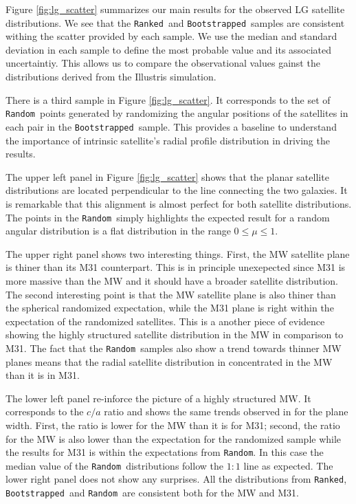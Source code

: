 \documentclass[a4paper,fleqn,usenatbib]{mnras}
\newcommand{\rank}{\texttt{Ranked}}
\newcommand{\boot}{\texttt{Bootstrapped}}
\newcommand{\rand}{\texttt{Random}}
\begin{document}
Figure \ref{fig:lg_scatter} summarizes our main results for the
observed LG satellite distributions.
We see that the \rank\ and \boot\ samples are consistent 
withing the scatter provided by each sample.
We use the median and standard deviation in each sample to define the
most probable value and its associated uncertaintiy.
This allows us to compare the observational values gainst the
distributions derived from the Illustris simulation.

There is a third sample in Figure \ref{fig:lg_scatter}. 
It corresponds to the set of \rand\ points generated
by randomizing the angular positions of the satellites in each pair in
the \boot\ sample. 
This provides a baseline to understand the importance 
of intrinsic satellite's radial profile distribution in driving the
results.   

The upper left panel in Figure \ref{fig:lg_scatter} shows that the
planar satellite distributions are located perpendicular to the line
connecting the two galaxies. 
It is remarkable that this alignment is almost perfect for both
satellite distributions. 
The points in the \rand\ simply highlights the expected result for a
random angular distribution is a flat distribution in the range
$0\leq\mu\leq 1$.

The upper right panel shows two interesting things. 
First, the MW satellite plane is thiner than its M31
counterpart. 
This is in principle unexepected since M31 is more
massive than the MW and it should have a broader satellite
distribution. 
The second interesting point is that the MW satellite plane is also
thiner than the spherical randomized expectation, while the M31 plane
is right within the expectation of the randomized satellites. 
This is a another piece of evidence showing the highly structured
satellite distribution in the MW in comparison to M31. 
The fact that the \rand\ samples also show a trend towards thinner MW
planes means that the radial satellite distribution in concentrated in
the MW than it is in M31.

The lower left panel re-inforce the picture of a highly structured
MW. 
It corresponds to the $c/a$ ratio and shows the same trends observed
in for the plane width. 
First, the ratio is lower for the MW than it is for M31; second, the
ratio for the MW is also lower than the expectation for the randomized
sample while the results for M31 is within the expectations from \rand.  
In this case the median value of the \rand\ distributions follow the
$1:1$ line as expected.
The lower right panel does not show any surprises. 
All the distributions from \rank, \boot\ and \rand\ are consistent
both for the MW and M31. 
 
\end{document}
